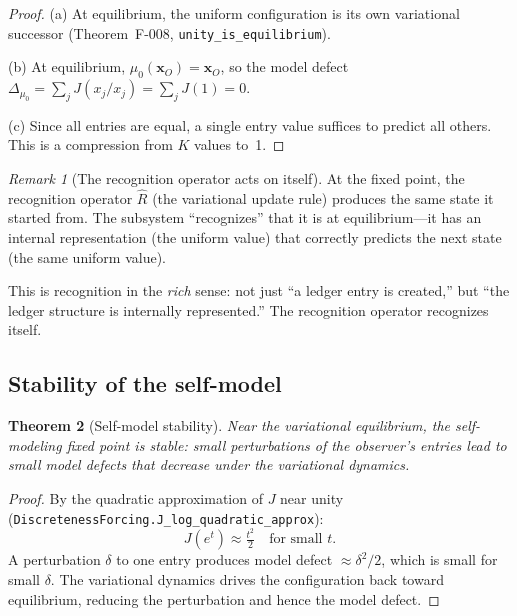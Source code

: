 \documentclass[11pt,a4paper]{article}
\theoremstyle{plain}
\newtheorem{theorem}{Theorem}[section]
\theoremstyle{definition}
\theoremstyle{remark}
\newtheorem{remark}[theorem]{Remark}
\newcommand{\Jcost}{J}
\begin{document}
\begin{proof}
(a) At equilibrium, the uniform configuration is its own variational
successor (Theorem~F-008, \texttt{unity\_is\_equilibrium}).

(b) At equilibrium, $\mu_0(\mathbf{x}_O) = \mathbf{x}_O$, so the
model defect $\Delta_{\mu_0} = \sum_j \Jcost(x_j / x_j) =
\sum_j \Jcost(1) = 0$.

(c) Since all entries are equal, a single entry value suffices to
predict all others.  This is a compression from $K$ values to~1.
\end{proof}

\begin{remark}[The recognition operator acts on itself]
At the fixed point, the recognition operator $\hat{R}$ (the variational
update rule) produces the same state it started from.  The subsystem
``recognizes'' that it is at equilibrium---it has an internal
representation (the uniform value) that correctly predicts the next
state (the same uniform value).

This is recognition in the \emph{rich} sense: not just ``a ledger entry
is created,'' but ``the ledger structure is internally represented.''
The recognition operator recognizes itself.
\end{remark}

\subsection{Stability of the self-model}

\begin{theorem}[Self-model stability]
\label{thm:stability}
Near the variational equilibrium, the self-modeling fixed point is
\emph{stable}: small perturbations of the observer's entries lead to
small model defects that decrease under the variational dynamics.
\end{theorem}

\begin{proof}
By the quadratic approximation of $\Jcost$ near unity
(\texttt{DiscretenessForcing.J\_log\_quadratic\_approx}):
\[
  \Jcost(e^t) \approx \tfrac{t^2}{2}
  \quad\text{for small } t.
\]
A perturbation $\delta$ to one entry produces model defect
$\approx \delta^2/2$, which is small for small $\delta$.  The
variational dynamics drives the configuration back toward equilibrium,
reducing the perturbation and hence the model defect.
\end{proof}

\end{document}
